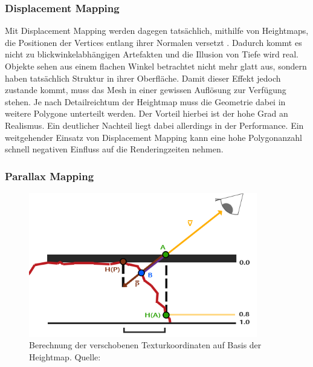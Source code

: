\subsubsection{Displacement Mapping}
Mit Displacement Mapping werden dagegen tatsächlich, mithilfe von Heightmaps, die Positionen
der Vertices entlang ihrer Normalen versetzt \parencite{Cook1984,Cook1987}. Dadurch kommt es nicht zu blickwinkelabhängigen Artefakten
und die Illusion von Tiefe wird real. Objekte sehen aus einem flachen Winkel betrachtet nicht mehr
glatt aus, sondern haben tatsächlich Struktur in ihrer Oberfläche. Damit dieser Effekt jedoch zustande kommt,
muss das Mesh in einer gewissen Auflösung zur Verfügung stehen. Je nach Detailreichtum der Heightmap
muss die Geometrie dabei in weitere Polygone unterteilt werden. Der Vorteil hierbei ist der hohe
Grad an Realismus. Ein deutlicher Nachteil liegt dabei allerdings in der Performance.
Ein weitgehender Einsatz von Displacement Mapping kann eine hohe Polygonanzahl schnell
negativen Einfluss auf die Renderingzeiten nehmen. 


\subsubsection{Parallax Mapping}

\begin{figure}[!h]
	\centering
	\includegraphics[width=0.89\textwidth]{Grafiken/Basics/Mapping/parallax_mapping.png}
	\begin{footnotesize}
		\caption{Berechnung der verschobenen Texturkoordinaten auf Basis der Heightmap. Quelle: \parencite{LearnOpenGL:Parallax}}
		\label{fig:parallax}
	\end{footnotesize}
\end{figure}

